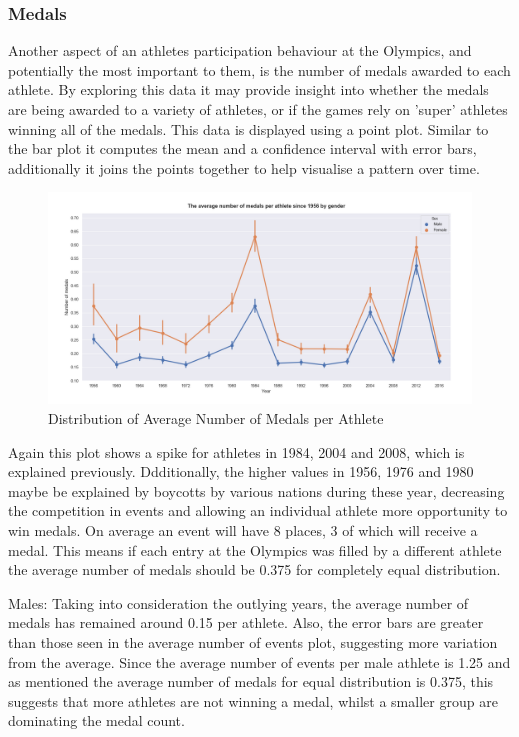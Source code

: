 \documentclass[a4 paper, 12pt]{article}
\begin{document}
        \subsubsection{Medals}
        Another aspect of an athletes participation behaviour at the Olympics, and potentially the most important to them, is the number of medals awarded to each athlete. By exploring this data it may provide insight into whether the medals are being awarded to a variety of athletes, or if the games rely on 'super' athletes winning all of the medals. This data is displayed using a point plot. Similar to the bar plot it computes the mean and a confidence interval with error bars, additionally it joins the points together to help visualise a pattern over time. 

        \begin{figure} [H]
            \centering
            \includegraphics[width=\textwidth, frame]
                {./images/graph/athlete_medal_pointplot.png}      
                \caption{Distribution of Average Number of Medals per Athlete} 
        \end{figure}
        Again this plot shows a spike for athletes in 1984, 2004 and 2008, which is explained previously. Ddditionally, the higher values in 1956, 1976 and 1980 maybe be explained by boycotts by various nations during these year, decreasing the competition in events and allowing an individual athlete more opportunity to win medals. On average an event will have 8 places, 3 of which will receive a medal. This means if each entry at the Olympics was filled by a different athlete the average number of medals should be 0.375 for completely equal distribution.          

        Males: Taking into consideration the outlying years, the average number of medals has remained around 0.15 per athlete. Also, the error bars are greater than those seen in the average number of events plot, suggesting more variation from the average. Since the average number of events per male athlete is 1.25 and as mentioned the average number of medals for equal distribution is 0.375, this suggests that more athletes are not winning a medal, whilst a smaller group are dominating the medal count.
\end{document}
